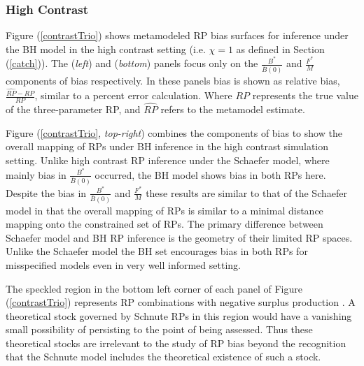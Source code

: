 \subsubsection{High Contrast \label{highConRes}}

%
Figure (\ref{contrastTrio}) shows metamodeled RP bias surfaces for inference
under the BH model in the high contrast setting (i.e. $\chi=1$ as defined in Section (\ref{catch})). 
The (\emph{left}) and (\emph{bottom}) panels focus only on the $\frac{B^*}{\bar B(0)}$ and
$\frac{F^*}{M}$ components of bias respectively. In these panels bias is shown
as relative bias, $\frac{\widehat{RP}-RP}{RP}$, similar to a percent error calculation.
Where $RP$ represents the true value of the three-parameter RP, and $\widehat{RP}$ 
refers to the metamodel estimate.

%
Figure (\ref{contrastTrio}, \emph{top-right}) combines the components of bias to
show the overall mapping of RPs under BH inference in the high contrast
simulation setting. Unlike high contrast RP inference under the Schaefer model,
where mainly bias in $\frac{B^*}{\bar B(0)}$ occurred, the BH model shows
bias in both RPs here. Despite the bias in $\frac{B^*}{\bar B(0)}$ and
$\frac{F^*}{M}$ these results are similar to that of the Schaefer model in
that the overall mapping of RPs is similar to a minimal distance mapping onto
the constrained set of RPs. %
The primary difference between Schaefer model and BH RP inference is the
geometry of their limited RP spaces. Unlike the Schaefer model the BH set
encourages bias in both RPs for misspecified models even in very well informed
setting.

%
The speckled region in the bottom left corner of each panel of Figure (\ref{contrastTrio}) 
represents RP combinations with negative surplus production \cite{myers_maximum_1999, punt_extending_2019}. 
A theoretical stock governed by Schnute RPs in this region would have a 
vanishing small possibility of persisting to the point of being assessed. 
Thus these theoretical stocks are irrelevant to the study of RP bias beyond 
the recognition that the Schnute model includes the theoretical existence of 
such a stock.  


%

